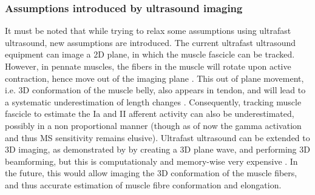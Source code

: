 \subsubsection{Assumptions introduced by ultrasound imaging}
It must be noted that while trying to relax some assumptions using ultrafast ultrasound, new assumptions are introduced. The current ultrafast ultrasound equipment can image a 2D plane, in which the muscle fascicle can be tracked. However, in pennate muscles, the fibers in the muscle will rotate upon active contraction, hence move out of the imaging plane \cite{finni_structural_2006}. This out of plane movement, i.e. 3D conformation of the muscle belly, also appears in tendon, and will lead to a systematic underestimation of length changes \cite{seynnes_ultrasound-based_2014}. Consequently, tracking muscle fascicle to estimate the Ia and II afferent activity can also be underestimated, possibly in a non proportional manner (though as of now the gamma activation and thus MS sensitivity remains elusive). Ultrafast ultrasound can be extended to 3D imaging, as demonstrated by \citeauthor{provost_3d_2014} by creating a 3D plane wave, and performing 3D beamforming, but this is computationaly and memory-wise very expensive \cite{provost_3d_2014}. In the future, this would allow imaging the 3D conformation of the muscle fibers, and thus accurate estimation of muscle fibre conformation and elongation. 




